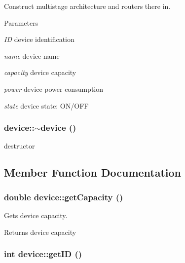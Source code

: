 Construct multistage architecture and routers there in. 


\begin{DoxyParams}{Parameters}
\item[{\em ID}]device identification \item[{\em name}]device name \item[{\em capacity}]device capacity \item[{\em power}]device power consumption \item[{\em state}]device state: ON/OFF \end{DoxyParams}
\hypertarget{classdevice_a08545ac77231c68a27c32633a9730a33}{
\subsubsection[{$\sim$device}]{\setlength{\rightskip}{0pt plus 5cm}device::$\sim$device ()}}
\label{classdevice_a08545ac77231c68a27c32633a9730a33}


destructor 



\subsection{Member Function Documentation}
\hypertarget{classdevice_ae444f5ce9e539235bc5df36f7b47609c}{
\subsubsection[{getCapacity}]{\setlength{\rightskip}{0pt plus 5cm}double device::getCapacity ()}}
\label{classdevice_ae444f5ce9e539235bc5df36f7b47609c}


Gets device capacity. 

\begin{DoxyReturn}{Returns}
device capacity 
\end{DoxyReturn}
\hypertarget{classdevice_a5b73405bc8184085f92306d4f323b572}{
\subsubsection[{getID}]{\setlength{\rightskip}{0pt plus 5cm}int device::getID ()}}
\label{classdevice_a5b73405bc8184085f92306d4f323b572}


